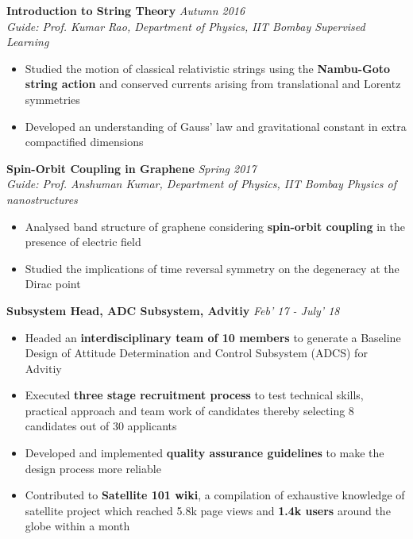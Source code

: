 \documentclass[10pt]{article}%
\newcommand{\xfilll}[2][1ex]{
\dimen0=#2\advance\dimen0 by #1
\leaders\hrule height \dimen0 depth -#1\hfill}
\begin{document}
{{\flushleft \bf \large{Introduction to String Theory}}  \hfill \textit{Autumn 2016} \\
{\em Guide: Prof. Kumar Rao, Department of Physics, IIT Bombay \hfill Supervised Learning}
\vspace{-1.5mm}
\begin{itemize}
\setlength\itemsep{0.01em}
    \item Studied the motion of classical relativistic strings using the \textbf{Nambu-Goto string action} and conserved currents arising from translational and Lorentz symmetries
    \item Developed an understanding of Gauss’ law and gravitational constant in extra compactified dimensions
\end{itemize}

{\flushleft \bf \large{Spin-Orbit Coupling in Graphene}}  \hfill \textit{Spring 2017}\\
{\em Guide: Prof. Anshuman Kumar, Department of Physics, IIT Bombay \hfill Physics of nanostructures}
\vspace{-1.5mm}
\begin{itemize}
\setlength\itemsep{0.01em}
    \item Analysed band structure of graphene considering \textbf{spin-orbit coupling} in the presence of  electric field
    \item Studied the implications of time reversal symmetry on the degeneracy at the Dirac point
\end{itemize}


{\flushleft \bf \large{Subsystem Head, ADC Subsystem, Advitiy}}  \hfill \textit{Feb' 17 - July' 18} \\
\begin{itemize}
\vspace{-4mm}
\setlength\itemsep{0.01em}
    \item Headed an \textbf{interdisciplinary team of 10 members} to generate a Baseline Design of Attitude Determination and Control Subsystem (ADCS) for Advitiy%
    \item Executed \textbf{three stage recruitment process} to test technical skills, practical approach and team work of candidates thereby selecting 8 candidates out of 30 applicants%
    \item Developed and implemented \textbf{quality assurance guidelines} to make the design process more reliable 
    \item Contributed to \textbf{Satellite 101 wiki}, a compilation of exhaustive knowledge of satellite project which reached 5.8k
    page views and \textbf{1.4k users} around the globe within a month%


\end{itemize}}
\end{document}
